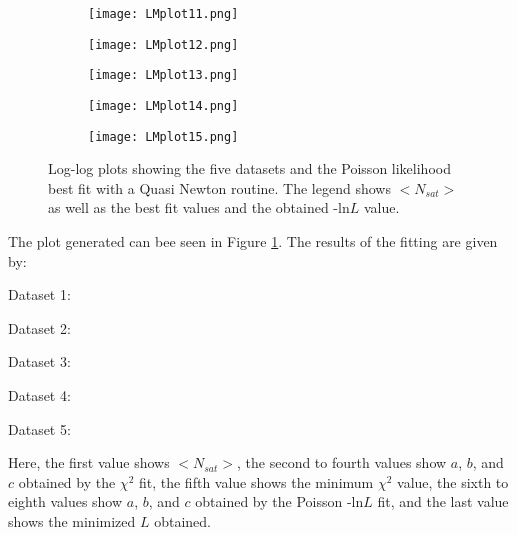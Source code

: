 \begin{figure}[ht!]
\begin{center}
        \begin{subfigure}{.49\textwidth}
      \centering
      \texttt{[image: LMplot11.png]}
    \end{subfigure}
    \vspace{-10pt}
    \begin{subfigure}{.49\textwidth}
      \centering
      \texttt{[image: LMplot12.png]} 
    \end{subfigure}
     \vspace{-10pt}
    \begin{subfigure}{.49\textwidth}
      \centering
      \texttt{[image: LMplot13.png]} 
    \end{subfigure}
     \vspace{-10pt}
    \begin{subfigure}{.49\textwidth}
      \centering
      \texttt{[image: LMplot14.png]} 
    \end{subfigure}
     \vspace{-10pt}
    \begin{subfigure}{.49\textwidth}
      \centering
      \texttt{[image: LMplot15.png]} 
    \end{subfigure}
    \caption{Log-log plots showing the five datasets and the Poisson likelihood best fit with a Quasi Newton routine. The legend shows $<N_{sat}>$ as well as the best fit values and the obtained -ln$L$ value.}
    \label{fig:QNfit}
\end{center}
\end{figure}

The plot generated can bee seen in Figure \ref{fig:QNfit}.
The results of the fitting are given by:

Dataset 1:

Dataset 2:

Dataset 3:

Dataset 4:

Dataset 5:


Here, the first value shows $<N_{sat}>$, the second to fourth values show $a$, $b$, and $c$ obtained by the $\chi^2$ fit, the fifth value shows the minimum $\chi^2$ value, the sixth to eighth values show $a$, $b$, and $c$ obtained by the Poisson -ln$L$ fit, and the last value shows the minimized \ln$L$ obtained.


